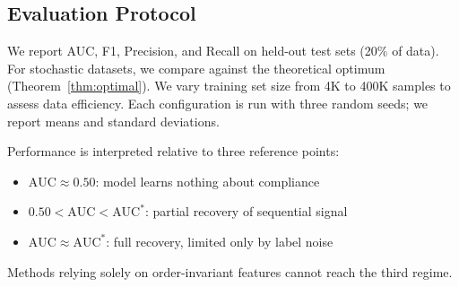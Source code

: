 \subsection{Evaluation Protocol}
\label{subsec:evaluation}

We report AUC, F1, Precision, and Recall on held-out test sets (20\% of data). For stochastic datasets, we compare against the theoretical optimum (Theorem~\ref{thm:optimal}). We vary training set size from 4K to 400K samples to assess data efficiency. Each configuration is run with three random seeds; we report means and standard deviations.

Performance is interpreted relative to three reference points:
\begin{itemize}
    \item $\text{AUC} \approx 0.50$: model learns nothing about compliance
    \item $0.50 < \text{AUC} < \text{AUC}^*$: partial recovery of sequential signal
    \item $\text{AUC} \approx \text{AUC}^*$: full recovery, limited only by label noise
\end{itemize}

Methods relying solely on order-invariant features cannot reach the third regime.